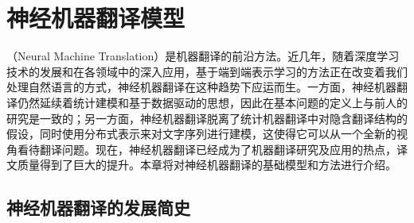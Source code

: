 
%


\renewcommand\figurename{图}%
\renewcommand\tablename{表}%


\chapter{神经机器翻译模型}

 （Neural Machine Translation）是机器翻译的前沿方法。近几年，随着深度学习技术的发展和在各领域中的深入应用，基于端到端表示学习的方法正在改变着我们处理自然语言的方式，神经机器翻译在这种趋势下应运而生。一方面，神经机器翻译仍然延续着统计建模和基于数据驱动的思想，因此在基本问题的定义上与前人的研究是一致的；另一方面，神经机器翻译脱离了统计机器翻译中对隐含翻译结构的假设，同时使用分布式表示来对文字序列进行建模，这使得它可以从一个全新的视角看待翻译问题。现在，神经机器翻译已经成为了机器翻译研究及应用的热点，译文质量得到了巨大的提升。本章将对神经机器翻译的基础模型和方法进行介绍。

\vspace{-0.7em}
\section{神经机器翻译的发展简史}

